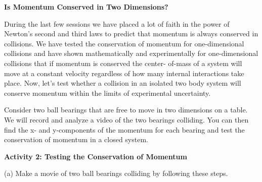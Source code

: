 





\textbf{Is Momentum Conserved in Two Dimensions? }

During the last few sessions we have placed a lot of faith in the power of Newton's
second and third laws to predict that momentum is always conserved in collisions.
We have tested the conservation of momentum for one-dimensional collisions and
have shown mathematically and experimentally for one-dimensional collisions
that if momentum is conserved the center- of-mass of a system will move at a
constant velocity regardless of how many internal interactions take place. Now,
let's test whether a collision in an isolated two body system will conserve
momentum within the limits of experimental uncertainty. 

Consider two ball bearings that are free to move in two dimensions on a table.
We will record and analyze a video of the two bearings colliding. You can then
find the x- and y-components of the momentum for each bearing and test the 
conservation of momentum in a closed system. 

\textbf{Activity 2: Testing the Conservation of Momentum }

(a) Make a movie of two ball bearings colliding by following these steps. 

